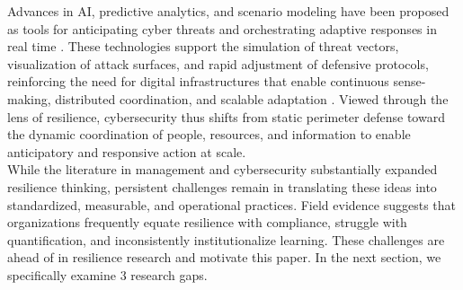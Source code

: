 Advances in AI, predictive analytics, and scenario modeling have been proposed as tools for anticipating cyber threats and orchestrating adaptive responses in real time \autocite{kuypers2018designing, gillard2023efficient}. These technologies support the simulation of threat vectors, visualization of attack surfaces, and rapid adjustment of defensive protocols, reinforcing the need for digital infrastructures that enable continuous sense-making, distributed coordination, and scalable adaptation \autocite{kuypers2018designing}. Viewed through the lens of resilience, cybersecurity thus shifts from static perimeter defense toward the dynamic coordination of people, resources, and information to enable anticipatory and responsive action at scale.\\

While the literature in management and cybersecurity substantially expanded resilience thinking, persistent challenges remain in translating these ideas into standardized, measurable, and operational practices. Field evidence suggests that organizations frequently equate resilience with compliance, struggle with quantification, and inconsistently institutionalize learning. These challenges are ahead of in resilience research and motivate this paper. In the next section, we specifically examine 3 research gaps.